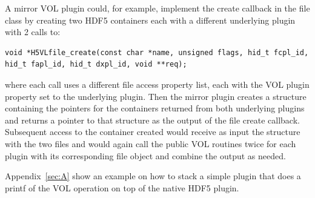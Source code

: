 A mirror VOL plugin could, for example, implement the create callback in the file class by creating two HDF5 containers each with a different underlying plugin with 2 calls to:
\begin{lstlisting}
void *H5VLfile_create(const char *name, unsigned flags, hid_t fcpl_id, hid_t fapl_id, hid_t dxpl_id, void **req);
\end{lstlisting}
where each call uses a different file access property list, each with the VOL plugin property set to the underlying plugin. Then the mirror plugin creates a structure containing the pointers for the containers returned from both underlying plugins and returns a pointer to that structure as the output of the file create callback. Subsequent access to the container created would receive as input the structure with the two files and would again call the public VOL routines twice for each plugin with its corresponding file object and combine the output as needed. 

Appendix~\ref{sec:A} show an example on how to stack a simple plugin that does a printf of the VOL operation on top of the native HDF5 plugin.

\pagebreak

